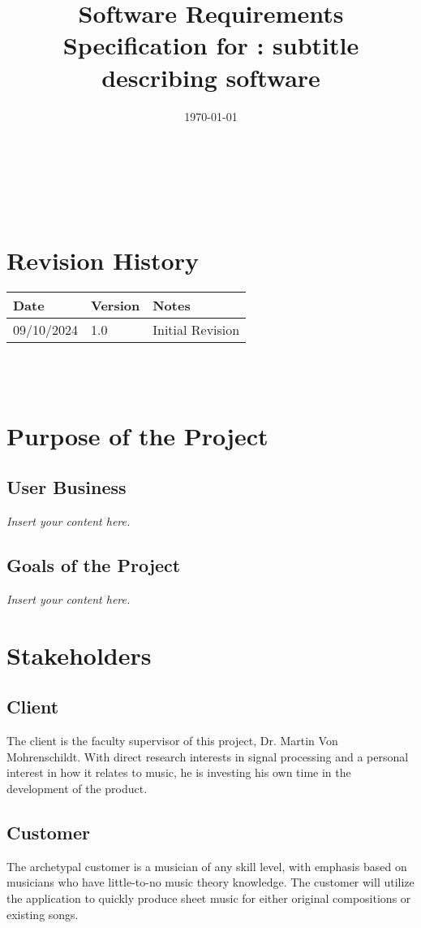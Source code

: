 \documentclass[12pt]{article}
\newcommand{\lips}{\textit{Insert your content here.}}
\begin{document}
\title{Software Requirements Specification for \progname: subtitle describing software} 
\author{\authname}
\date{\today}
	
\maketitle

~\newpage


\tableofcontents

~\newpage

\section*{Revision History}

\begin{tabularx}{\textwidth}{p{3cm}p{2cm}X}
\toprule {\textbf{Date}} & {\textbf{Version}} & {\textbf{Notes}}\\
\midrule
09/10/2024 & 1.0 & Initial Revision\\
\bottomrule
\end{tabularx}

~\\

~\newpage
\section{Purpose of the Project}
\subsection{User Business}
\lips
\subsection{Goals of the Project}
\lips
\section{Stakeholders}
\subsection{Client}
The client is the faculty supervisor of this project, Dr. Martin Von Mohrenschildt. With direct research interests in signal processing and a personal interest in how it relates to 
music, he is investing his own time in the development of the product.
\subsection{Customer}
The archetypal customer is a musician of any skill level, with emphasis based on musicians who have little-to-no music theory knowledge. The customer will utilize the application 
to quickly produce sheet music for either original compositions or existing songs. 
\end{document}
